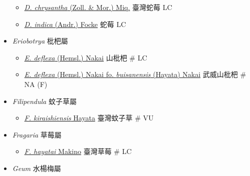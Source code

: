 \begin{itemize}
  \begin{itemize}
        \item[] \href{http://www.theplantlist.org/tpl1.1/search?q=Duchesnea+chrysantha}{\textit{D. chrysantha} (Zoll. \& Mor.) Miq.}   臺灣蛇莓   LC
        \item[] \href{http://www.theplantlist.org/tpl1.1/search?q=Duchesnea+indica}{\textit{D. indica} (Andr.) Focke}   蛇莓   LC
  \end{itemize}
 \item[] \textit{Eriobotrya} 枇杷屬
                                
  \begin{itemize}
        \item[] \href{http://www.theplantlist.org/tpl1.1/search?q=Eriobotrya+deflexa}{\textit{E. deflexa} (Hemsl.) Nakai}   山枇杷  \# LC
        \item[] \href{http://www.theplantlist.org/tpl1.1/search?q=Eriobotrya+deflexa+fo.+buisanensis}{\textit{E. deflexa} (Hemsl.) Nakai fo. \textit{buisanensis} (Hayata) Nakai}   武威山枇杷  \# NA (F)
  \end{itemize}
 \item[] \textit{Filipendula} 蚊子草屬
                                
  \begin{itemize}
        \item[] \href{http://www.theplantlist.org/tpl1.1/search?q=Filipendula+kiraishiensis}{\textit{F. kiraishiensis} Hayata}   臺灣蚊子草  \# VU
  \end{itemize}
 \item[] \textit{Fragaria} 草莓屬
                                
  \begin{itemize}
        \item[] \href{http://www.theplantlist.org/tpl1.1/search?q=Fragaria+hayatai}{\textit{F. hayatai} Makino}   臺灣草莓  \# LC
  \end{itemize}
 \item[] \textit{Geum} 水楊梅屬
                                

\end{itemize}
